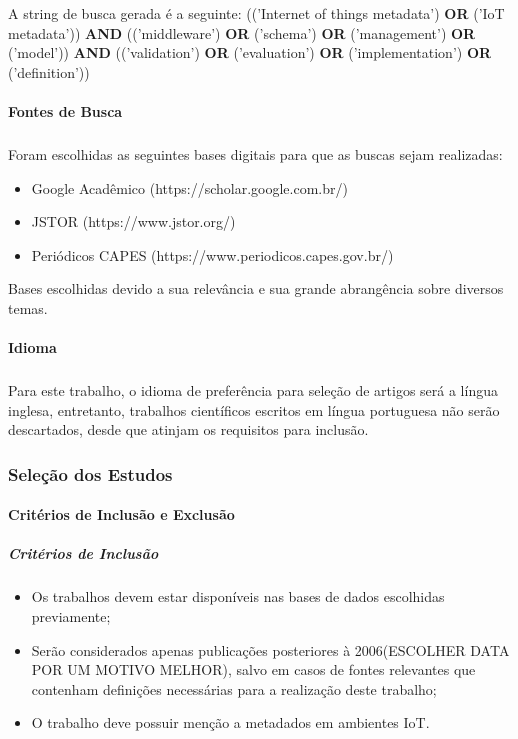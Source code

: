 A string de busca gerada é a seguinte:
(('Internet of things metadata') \textbf{OR} ('IoT metadata')) \textbf{AND} (('middleware') \textbf{OR} ('schema') \textbf{OR} ('management') \textbf{OR} ('model')) \textbf{AND} (('validation') \textbf{OR} ('evaluation') \textbf{OR} ('implementation') \textbf{OR} ('definition'))

\paragraph{Fontes de Busca}
\subparagraph{}
Foram escolhidas as seguintes bases digitais para que as buscas sejam realizadas:
\begin{itemize}
  \item Google Acadêmico (https://scholar.google.com.br/)
  \item JSTOR (https://www.jstor.org/)
  \item Periódicos CAPES (https://www.periodicos.capes.gov.br/) %
\end{itemize}
Bases escolhidas devido a sua relevância e sua grande abrangência sobre diversos temas.

\paragraph{Idioma}
\subparagraph{}
Para este trabalho, o idioma de preferência para seleção de artigos será a língua inglesa, entretanto, trabalhos científicos escritos em
língua portuguesa não serão descartados, desde que atinjam os requisitos para inclusão.

\subsubsection{Seleção dos Estudos}
\paragraph{Critérios de Inclusão e Exclusão}
\subparagraph{Critérios de Inclusão}
\begin{itemize}
  \item Os trabalhos devem estar disponíveis nas bases de dados escolhidas previamente;
  \item Serão considerados apenas publicações posteriores à 2006{\color{red}(ESCOLHER DATA POR UM MOTIVO MELHOR)}, salvo em casos de fontes relevantes que contenham definições necessárias para a realização deste trabalho;
  \item O trabalho deve possuir menção a metadados em ambientes \acrlong{IoT}.
\end{itemize}

